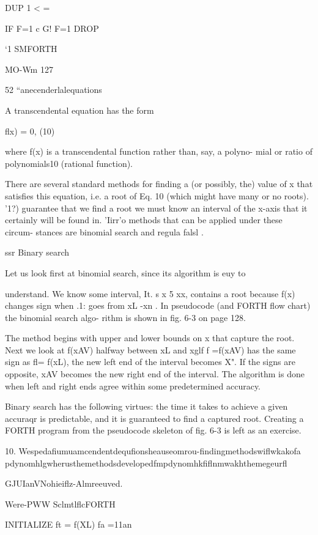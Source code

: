 {DUP 1 < =

IF F=1 c G! F=1 DROP

 

‘1 SMFORTH

MO-Wm 127

52 “anecenderlalequations

A transcendental equation has the form

flx) = 0, (10)

where f(x) is a transcendental function rather than, say, a polyno-
mial or ratio of polynomials10 (rational function).

There are several standard methods for finding a (or possibly, the)
value of x that satisfies this equation, i.e. a root of Eq. 10 (which
might have many or no roots). '1?) guarantee that we find a root
we must know an interval of the x-axis that it certainly will be
found in. 'Iirr'o methods that can be applied under these circum-
stances are binomial search and regula falsl .

ssr Binary search

Let us look first at binomial search, since its algorithm is euy to

understand. We know some interval, It. s x 5 xx, contains a
root because f(x) changes sign when .1: goes from xL -xn . In
pseudocode (and FORTH flow chart) the binomial search algo-
rithm is shown in fig. 6-3 on page 128.

The method begins with upper and lower bounds on x that capture
the root. Next we look at f(xAV) halfway between xL and xglf
f =f(xAV) has the same sign as fl= f(xL), the new left end of the
interval becomes X". If the signs are opposite, xAV becomes the
new right end of the interval. The algorithm is done when left and
right ends agree within some predetermined accuracy.

Binary search has the following virtues: the time it takes to
achieve a given accuraqr is predictable, and it is guaranteed to
find a captured root. Creating a FORTH program from the
pseudocode skeleton of fig. 6-3 is left as an exercise.

 

10. Wespedafiumuamcendentdequfionsheauseomrou-findingmethodswiflwkakofa
pdynomhlgwherusthemethodsdevelopedfmpdynomhkfiflnmwakhthemegeurfl

GJUIanVNohieiflz-Almreeuved.

Were-PWW SclmtlflcFORTH

 

INITIALIZE
ft = f(XL) fa =11an

}
